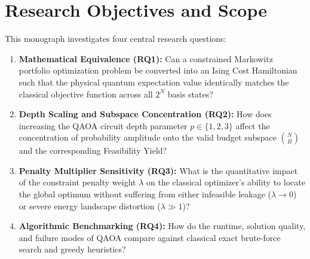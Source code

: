\section{Research Objectives and Scope}
This monograph investigates four central research questions:
\begin{enumerate}
    \item \textbf{Mathematical Equivalence (RQ1):} Can a constrained Markowitz portfolio optimization problem be converted into an Ising Cost Hamiltonian such that the physical quantum expectation value identically matches the classical objective function across all $2^N$ basis states?
    \item \textbf{Depth Scaling and Subspace Concentration (RQ2):} How does increasing the QAOA circuit depth parameter $p \in \{1, 2, 3\}$ affect the concentration of probability amplitude onto the valid budget subspace $\binom{N}{B}$ and the corresponding Feasibility Yield?
    \item \textbf{Penalty Multiplier Sensitivity (RQ3):} What is the quantitative impact of the constraint penalty weight $\lambda$ on the classical optimizer's ability to locate the global optimum without suffering from either infeasible leakage ($\lambda \to 0$) or severe energy landscape distortion ($\lambda \gg 1$)?
    \item \textbf{Algorithmic Benchmarking (RQ4):} How do the runtime, solution quality, and failure modes of QAOA compare against classical exact brute-force search and greedy heuristics?
\end{enumerate}

